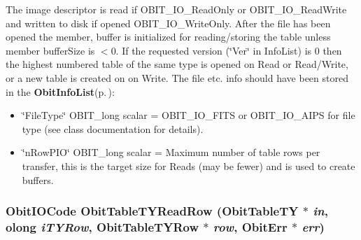The image descriptor is read if OBIT\_\-IO\_\-Read\-Only or OBIT\_\-IO\_\-Read\-Write and written to disk if opened OBIT\_\-IO\_\-Write\-Only. After the file has been opened the member, buffer is initialized for reading/storing the table unless member buffer\-Size is $<$0. If the requested version (\char`\"{}Ver\char`\"{} in Info\-List) is 0 then the highest numbered table of the same type is opened on Read or Read/Write, or a new table is created on on Write. The file etc. info should have been stored in the {\bf Obit\-Info\-List}{\rm (p.\,\pageref{structObitInfoList})}: \begin{itemize}
\item \char`\"{}File\-Type\char`\"{} OBIT\_\-long scalar = OBIT\_\-IO\_\-FITS or OBIT\_\-IO\_\-AIPS for file type (see class documentation for details). \item \char`\"{}n\-Row\-PIO\char`\"{} OBIT\_\-long scalar = Maximum number of table rows per transfer, this is the target size for Reads (may be fewer) and is used to create buffers. 
\end{itemize}
\subsubsection{\setlength{\rightskip}{0pt plus 5cm}Obit\-IOCode Obit\-Table\-TYRead\-Row ({\bf Obit\-Table\-TY} $\ast$ {\em in}, {\bf olong} {\em i\-TYRow}, {\bf Obit\-Table\-TYRow} $\ast$ {\em row}, {\bf Obit\-Err} $\ast$ {\em err})}\label{ObitTableTY_8h_a18}


